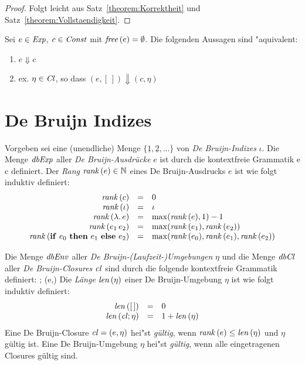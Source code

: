 \documentclass[12pt,fleqn]{article}
\newcommand{\Cl}{\name{Cl}}
\newcommand{\cl}{\name{cl}}
\begin{document}
\begin{proof}
  Folgt leicht aus Satz~\ref{theorem:Korrektheit} und Satz~\ref{theorem:Vollstaendigkeit}.
\end{proof}

\begin{corollary}
  Sei $e \in {\text{\it Exp\/}}$, $c \in {\text{\it Const\/}}$ mit ${\text{\it free\/}}\,(e) = \emptyset$. Die folgenden Aussagen sind "aquivalent:
  \begin{enumerate}
    \item $e \Downarrow c$
    \item ex. $\eta\in\Cl$, so dass $(e,[\,]) \Downarrow (c,\eta)$
  \end{enumerate}
\end{corollary}


\section{De Bruijn Indizes}

\begin{definition}[Expressions]
  Vorgeben sei eine (unendliche) Menge $\{\underline{1},\underline{2},\ldots\}$ von {\em De Bruijn-Indizes}
  $\iota$. Die Menge ${\text{\it dbExp\/}}$ aller {\em De Bruijn-Ausdr\"ucke} $e$ ist durch die kontextfreie Grammatik
  \bgram
  e \is c \mid \iota \mid {} \mid {} \mid {}
  \egram
  definiert. Der {\em Rang} ${\text{\it rank\/}}\,(e) \in {\mathord{\mathbb N}}$ eines De Bruijn-Ausdrucks $e$ ist wie folgt induktiv definiert:
  \[\begin{array}{rcl}
    {\text{\it rank\/}}\,(c) &=& 0 \\
    {\text{\it rank\/}}\,(\iota) &=& \iota \\
    {\text{\it rank\/}}\,(\lambda .\,e) &=& \max({\text{\it rank\/}}\,(e),1) - 1 \\
    {\text{\it rank\/}}\,(e_1\,e_2) &=& \max({\text{\it rank\/}}\,(e_1),{\text{\it rank\/}}\,(e_2)) \\
    {\text{\it rank\/}}\,(\mathbf{if}\ e_0\ \mathbf{then}\ e_1\ \mathbf{else}\ e_2) &=& \max({\text{\it rank\/}}\,(e_0),{\text{\it rank\/}}\,(e_1),{\text{\it rank\/}}\,(e_2))
  \end{array}\]
\end{definition}

\begin{definition}
  Die Menge ${\text{\it dbEnv\/}}$ aller {\em De Bruijn-(Laufzeit-)Umgebungen} $\eta$ und die Menge ${\text{\it dbCl\/}}$ aller
  {\em De Bruijn-Closures} $\cl$ sind durch die folgende kontextfreie Grammatik definiert:
  \bgram
  \eta \is [\,] \mid \cl;\eta \n
  \cl \is (e,\eta)
  \egram
  Die {\em L\"ange} ${\text{\it len\/}}\,(\eta)$ einer De Bruijn-Umgebung $\eta$ ist wie folgt induktiv definiert:
  \[\begin{array}{rcl}
    \len{[\,]} &=& 0 \\
    \len{\cl;\eta} &=& 1 + \len{\eta}
  \end{array}\]
  Eine De Bruijn-Closure $\cl = (e,\eta)$ hei"st {\em g\"ultig}, wenn ${\text{\it rank\/}}\,(e) \le {\text{\it len\/}}\,(\eta)$ und
  $\eta$ g\"ultig ist. Eine De Bruijn-Umgebung $\eta$ hei"st {\em g\"ultig}, wenn alle eingetragenen
  Closures g\"ultig sind.
\end{definition}
\end{document}

